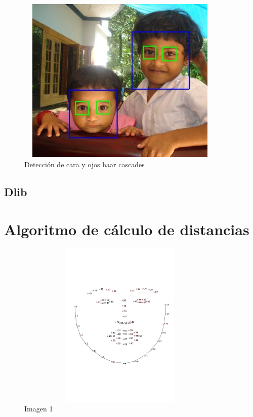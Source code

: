 \documentclass{article}
\begin{document}
\begin{figure}[H]
  \centering
  \includegraphics[width=100mm, height=80mm]{images/face_detection_haar_cascades.jpg}
  \caption{Detección de cara y ojos haar cascades}
\end{figure}

\subsection{Dlib}

\section{Algoritmo de cálculo de distancias}

\begin{figure}[H]
  \centering
  \includegraphics[width=100mm, height=80mm]{images/border_distances.jpg}
  \caption{Imagen 1}
\end{figure}
\end{document}
